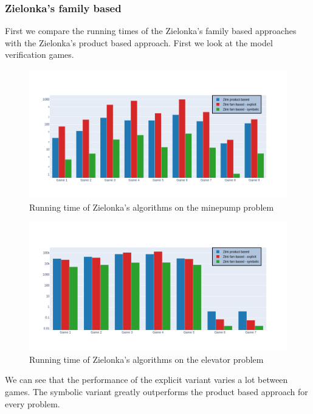 \subsubsection{Zielonka's family based}
First we compare the running times of the Zielonka's family based approaches with the Zielonka's product based approach. First we look at the model verification games.
\begin{figure}[H]
	\includegraphics[width=1\linewidth]{"results/minepump/Zlnk product based_Zlnk fam based - explicit_Zlnk fam based - symbolic_"}
	\caption{Running time of Zielonka's algorithms on the minepump problem}
	\label{fig:minepumpzlnks}
\end{figure}%
\begin{figure}[H]
	\includegraphics[width=1\linewidth]{"results/elevator/Zlnk product based_Zlnk fam based - explicit_Zlnk fam based - symbolic_"}
	\caption{Running time of Zielonka's algorithms on the elevator problem}
	\label{fig:elevatorzlnks}
\end{figure}%
We can see that the performance of the explicit variant varies a lot between games. The symbolic variant greatly outperforms the product based approach for every problem.

